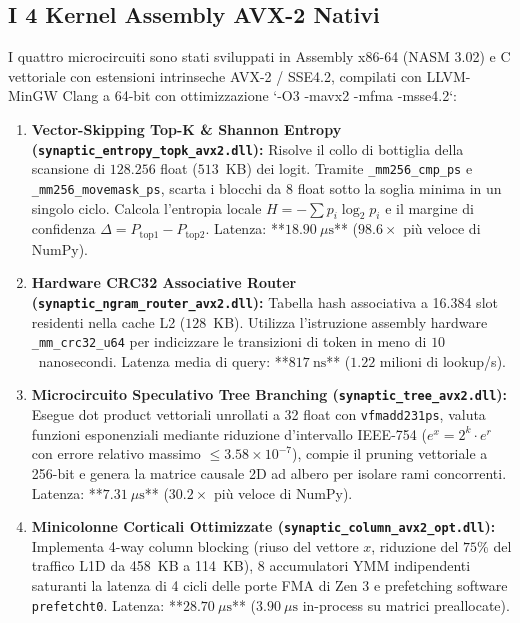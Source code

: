 \documentclass[10pt,a4paper]{article}
\theoremstyle{definition}
\begin{document}
\subsection{I 4 Kernel Assembly AVX-2 Nativi}
I quattro microcircuiti sono stati sviluppati in Assembly x86-64 (NASM 3.02) e C vettoriale con estensioni intrinseche AVX-2 / SSE4.2, compilati con LLVM-MinGW Clang a 64-bit con ottimizzazione `-O3 -mavx2 -mfma -msse4.2`:
\begin{enumerate}[leftmargin=1.5em]
    \item \textbf{Vector-Skipping Top-K \& Shannon Entropy (\texttt{synaptic\_entropy\_topk\_avx2.dll}):} Risolve il collo di bottiglia della scansione di $128.256$ float ($513$~KB) dei logit. Tramite \texttt{\_mm256\_cmp\_ps} e \texttt{\_mm256\_movemask\_ps}, scarta i blocchi da 8 float sotto la soglia minima in un singolo ciclo. Calcola l'entropia locale $H = -\sum p_i \log_2 p_i$ e il margine di confidenza $\Delta = P_{\text{top1}} - P_{\text{top2}}$. Latenza: **$18.90\ \mu\text{s}$** ($98.6\times$ pi\`u veloce di NumPy).
    \item \textbf{Hardware CRC32 Associative Router (\texttt{synaptic\_ngram\_router\_avx2.dll}):} Tabella hash associativa a 16.384 slot residenti nella cache L2 ($128$~KB). Utilizza l'istruzione assembly hardware \texttt{\_mm\_crc32\_u64} per indicizzare le transizioni di token in meno di $10$~nanosecondi. Latenza media di query: **$817\ \text{ns}$** ($1.22$ milioni di lookup/s).
    \item \textbf{Microcircuito Speculativo Tree Branching (\texttt{synaptic\_tree\_avx2.dll}):} Esegue dot product vettoriali unrollati a 32 float con \texttt{vfmadd231ps}, valuta funzioni esponenziali mediante riduzione d'intervallo IEEE-754 ($e^x = 2^k \cdot e^r$ con errore relativo massimo $\le 3.58 \times 10^{-7}$), compie il pruning vettoriale a 256-bit e genera la matrice causale 2D ad albero per isolare rami concorrenti. Latenza: **$7.31\ \mu\text{s}$** ($30.2\times$ pi\`u veloce di NumPy).
    \item \textbf{Minicolonne Corticali Ottimizzate (\texttt{synaptic\_column\_avx2\_opt.dll}):} Implementa 4-way column blocking (riuso del vettore $x$, riduzione del $75\%$ del traffico L1D da 458~KB a 114~KB), 8 accumulatori YMM indipendenti saturanti la latenza di 4 cicli delle porte FMA di Zen 3 e prefetching software \texttt{prefetcht0}. Latenza: **$28.70\ \mu\text{s}$** ($3.90\ \mu\text{s}$ in-process su matrici preallocate).
\end{enumerate}
\end{document}

